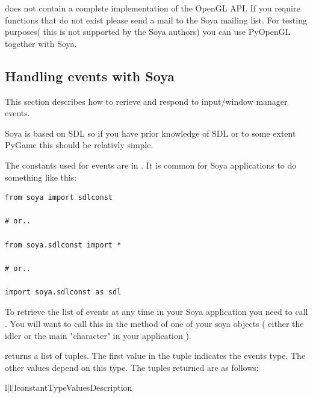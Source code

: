 \begin{notice}
 does not contain a complete implementation of the OpenGL
API. If you require functions that do not exist please send a mail to the Soya
mailing list. For testing purposes( this is not supported by the Soya authors) 
you can use PyOpenGL together with Soya. 
\end{notice}

\subsection{Handling events with Soya}

This section describes how to rerieve and respond to input/window manager events. 

Soya is based on SDL so if you have prior knowledge of SDL or to some extent 
PyGame this should be relativly simple. 

The constants used for events are in . It is common for 
Soya applications to do something like this:

\begin{verbatim}
from soya import sdlconst

# or..

from soya.sdlconst import *

# or..

import soya.sdlconst as sdl
\end{verbatim}

To retrieve the list of events at any time in your Soya application you need to
call . You will want to call this in the 
 method of one of your soya objects ( either the idler
or the main "character" in your application ).

 returns a list of tuples. The first value in 
the tuple indicates the events type. The other values depend on this type. 
The tuples returned are as follows:

\begin{tableiii}{l|l|l}{constant}{Type}{Values}{Description}
\end{tableiii}

